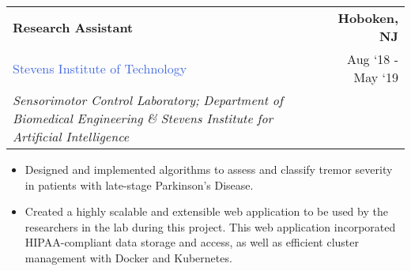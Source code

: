 \documentclass[10pt]{article}
\newcommand{\highlightcolor}{RoyalBlue}
\newcommand{\tabularxwidth}{\textwidth}
\begin{document}
    \begin{minipage}{\tabularxwidth}

        \begin{tabularx}{\tabularxwidth}{X r}
            \textbf{Research Assistant} & \textbf{Hoboken, 
        NJ} \\
            
    
    
    
    

    
        \textcolor{\highlightcolor}{Stevens Institute of Technology} & 
        
    Aug ‘18 - 
    May ‘19 \\
        
            \textit{Sensorimotor Control Laboratory;}
                \textit{Department of Biomedical Engineering} \textit{\&}
                \textit{Stevens Institute for Artificial Intelligence} & \\
        
    
            
        \end{tabularx}

        \begin{itemize}[noitemsep, topsep=3pt, parsep=0pt, partopsep=0pt]
            
                \item 
    Designed and implemented algorithms to assess and classify tremor severity in patients with late-stage Parkinson's Disease.
            
                \item 
    Created a highly scalable and extensible web application to be used by the researchers in the lab during this project. This web application incorporated HIPAA-compliant data storage and access, as well as efficient cluster management with Docker and Kubernetes.
            

\end{itemize}
\end{minipage}
\end{document}
